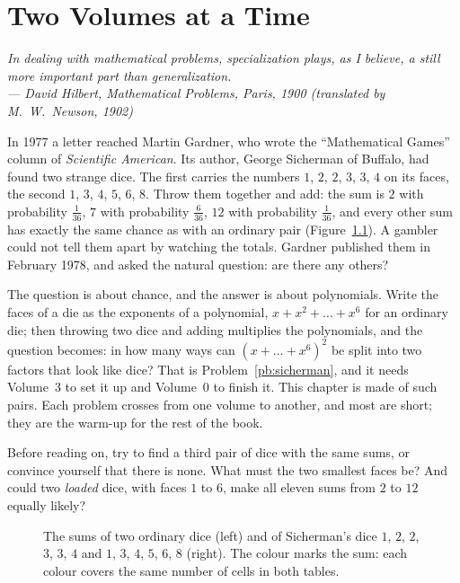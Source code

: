 \chapter{Two Volumes at a Time}

\begin{center}\itshape
In dealing with mathematical problems, specialization plays, as I believe, a still more important part than generalization.\\
\upshape --- David Hilbert, \emph{Mathematical Problems}, Paris, 1900 (translated by M.~W.~Newson, 1902)
\end{center}

In 1977 a letter reached Martin Gardner, who wrote the ``Mathematical Games'' column of \emph{Scientific American}. Its author,
George Sicherman of Buffalo, had found two strange dice. The first carries the numbers $1$, $2$, $2$, $3$, $3$, $4$ on its faces, the second
$1$, $3$, $4$, $5$, $6$, $8$. Throw them together and add: the sum is $2$ with probability $\frac1{36}$, $7$ with probability $\frac6{36}$,
$12$ with probability $\frac1{36}$, and every other sum has exactly the same chance as with an ordinary pair
(Figure~\ref{fig:dice}). A gambler could not tell them apart by watching the totals. Gardner published them in February 1978,
and asked the natural question: are there any others?

The question is about chance, and the answer is about polynomials. Write the faces of a die as the exponents of a polynomial,
$x+x^2+\dots+x^6$ for an ordinary die; then throwing two dice and adding multiplies the polynomials, and the question becomes:
in how many ways can $(x+\dots+x^6)^2$ be split into two factors that look like dice? That is Problem~\ref{pb:sicherman}, and
it needs Volume~3 to set it up and Volume~0 to finish it. This chapter is made of such pairs. Each problem crosses from one volume
to another, and most are short; they are the warm-up for the rest of the book.

\begin{think}
Before reading on, try to find a third pair of dice with the same sums, or convince yourself that there is none. What must the
two smallest faces be? And could two \emph{loaded} dice, with faces $1$ to $6$, make all eleven sums from $2$ to $12$ equally
likely?
\end{think}

\begin{figure}[ht]
\centering
{}
\caption{The sums of two ordinary dice (left) and of Sicherman's dice $1$, $2$, $2$, $3$, $3$, $4$ and $1$, $3$, $4$, $5$, $6$, $8$ (right). The colour
marks the sum: each colour covers the same number of cells in both tables.}
\label{fig:dice}
\end{figure}

